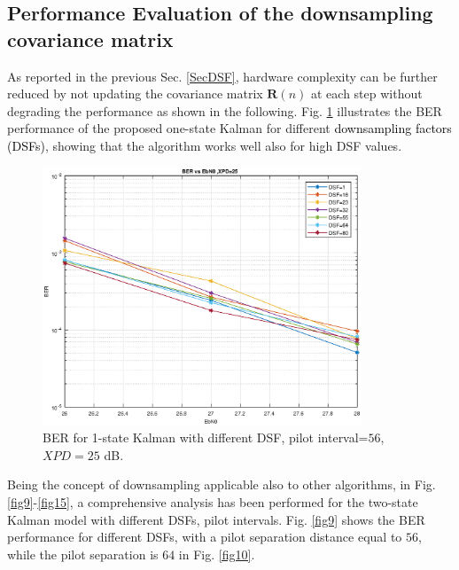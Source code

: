 \subsection{Performance Evaluation of the downsampling covariance matrix}
\label{PEDSF}
As reported in the previous Sec. \ref{SecDSF}, hardware complexity can be further reduced by not updating the covariance matrix $\mathbf{R}(n)$ at each step without degrading the performance as shown in the following.
Fig. \ref{fig9_a} illustrates the BER performance of the proposed one-state Kalman for different \textcolor{black}{downsampling factors (DSFs)}, showing that the algorithm works well also for high DSF values. 

\begin{figure}
	\includegraphics[width=0.85\textwidth]{figures/fig_red_kalman/Fig9_a.eps}
	\caption{BER for 1-state Kalman with different DSF, pilot interval=$56$, $XPD=25$ dB.}
	\label{fig9_a}      
\end{figure}

Being the concept of downsampling applicable also to other algorithms, in Fig. \ref{fig9}-\ref{fig15}, a comprehensive analysis has been performed for the two-state Kalman model with different DSFs, pilot intervals. Fig. \ref{fig9} shows the BER performance for different DSFs, with a pilot separation distance equal to $56$, while the pilot separation is $64$ in Fig. \ref{fig10}.


